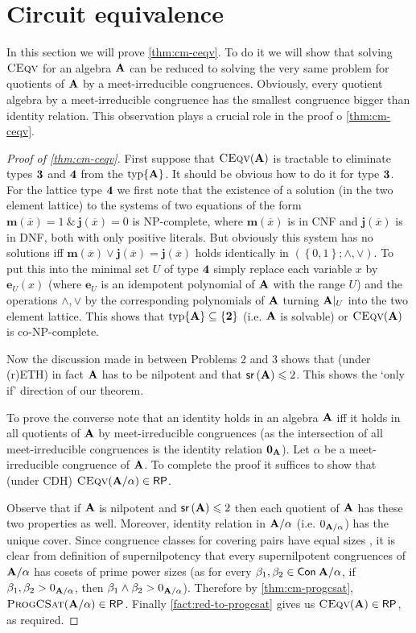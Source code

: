 \documentclass[11pt,a4paper]{amsart}
\newcommand{\npc}{\textsf{NP}-complete\xspace}
\newcommand{\conpc}{\textsf{co-NP}-complete\xspace}
\newcommand{\rptime}{\textsf{RP}\xspace}
\newcommand{\m}[1]{{\uppercase {\bf{#1}}}}
\newcommand{\set}[1]{{\left\{ {#1} \right\} }}
\newcommand{\ci}{\subseteq}
\renewcommand{\leq}{\leqslant}
\newcommand{\join}{\vee}
\newcommand{\meet}{\wedge}
\newcommand{\con}[1]{{\sf Con\:\m{#1}}}
\newcommand{\po}[1]{{\mathbf {#1}}}
\newcommand{\tn} [1]{{\bf {#1}}}
\newcommand{\typ}{{\rm typ}}
\newcommand{\typset}[1]{\typ\set{#1}}
\newcounter{note}
\renewcommand{\o}[1]{\overline {#1}}
\newcommand{\gProblem}[2]{\ensuremath{\operatorname{\textup{\textsc{{#2}}}}
		\ifthenelse{\equal{#1}{}}{}{\!\left( {#1} \right)}}}
\newcommand{\ceqv}[1]{\gProblem{#1}{CEqv}}
\newcommand{\progcsat}[1]{\gProblem{#1}{ProgCSat}}
\newcommand{\sr}[1]{{\mathsf{sr}\left(#1\right)}}
\newcommand{\cdhh}{CDH\xspace}
\newcommand{\prethh}{(r)ETH\xspace}
\begin{document}
\section{Circuit equivalence}
In this section we will prove \cref{thm:cm-ceqv}. To do it we will show that solving \ceqv{} for an algebra $\m A$ can be reduced to solving the very same problem for quotients of $\m A$ by a meet-irreducible congruences. Obviously, every quotient algebra by a meet-irreducible congruence has the smallest congruence bigger than identity relation. This observation plays a crucial role in the proof o \cref{thm:cm-ceqv}.

\begin{proof}[Proof of \cref{thm:cm-ceqv}]
First suppose that $\ceqv{\m A}$ is tractable
to eliminate types $\tn 3$ and $\tn 4$ from the $\typset{\m A}$.
It should be obvious how to do it for type $\tn 3$.
For the lattice type $\tn 4$ we first note that the existence of a solution
(in the two element lattice)
to the systems of two equations of the form $\po m(\o x)=1 \ \& \ \po j(\o x)=0$ is \npc,
where $\po m(\o x)$ is in CNF and $\po j(\o x)$ is in DNF, both with only positive literals.
But obviously this system has no solutions iff
$\po m(\o x)\join\po j(\o x)=\po j(\o x)$ holds identically in $(\set{0,1};\meet,\join)$.
To put this into the minimal set $U$ of type $\tn 4$ simply replace each variable $x$ by $\po e_U(x)$
(where $\po e_U$ is an idempotent polynomial of $\m A$ with the range $U$)
and the operations $\meet,\join$ by the corresponding polynomials of $\m A$
turning $\m A|_U$ into the two element lattice.
This shows that $\typset{\m A}\ci \set{\tn 2}$ (i.e. $\m A$ is solvable) or $\ceqv{\m A}$ is \conpc.

Now the discussion made in \cite[Section 4]{IdziakKK22STACS} between Problems 2 and 3
shows that (under \prethh) in fact $\m A$ has to be nilpotent and that $\sr{\m A}\leq 2$.
This shows the `only if' direction of our theorem.

\medskip
To prove the converse note that an identity holds in an algebra $\m A$
iff it holds in all quotients of $\m A$ by meet-irreducible congruences
(as the intersection of all meet-irreducible congruences is the identity relation $\m 0_{\m A}$). Let $\alpha$ be a meet-irreducible congruence of $\m A$. To complete the proof it suffices to show that (under \cdhh) $\ceqv{\m A/\alpha}\in\rptime$. 

Observe that if $\m A$ is nilpotent and $\sr{\m A}\leq 2$
then each quotient of $\m A$ has these two properties as well. Moreover, identity relation in $\m A/\alpha$ (i.e. $0_{\m A/\alpha }$)  has the unique cover. Since congruence classes for covering pairs have equal sizes \cite[Colloraly 7.5]{fm}, it is clear from definition of supernilpotency that every supernilpotent congruences of $\m A/\alpha$ has cosets of prime power sizes (as for every $\beta_1,\beta_2\in\con{A/\alpha}$, if $\beta_1,\beta_2>0_{\m A/\alpha}$, then  $\beta_1\meet \beta_2> 0_{\m A/\alpha}$). Therefore by \cref{thm:cm-progcsat}, $\progcsat{\m A/\alpha}\in\rptime$. Finally \cref{fact:red-to-progcsat} gives us $\ceqv{\m A}\in\rptime$, as required.
\end{proof}
\end{document}
